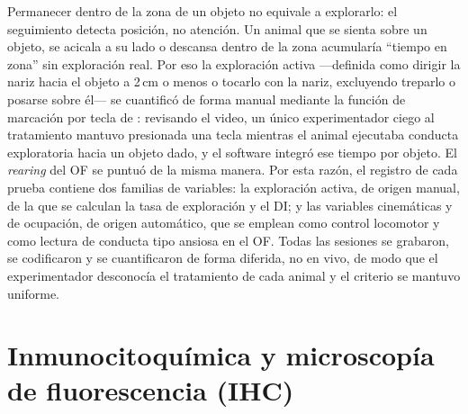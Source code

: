 Permanecer dentro de la zona de un objeto no equivale a explorarlo: el seguimiento detecta posición, no atención. Un animal que se sienta sobre un objeto, se acicala a su lado o descansa dentro de la zona acumularía \enquote{tiempo en zona} sin exploración real. Por eso la exploración activa ---definida como dirigir la nariz hacia el objeto a 2\,cm o menos o tocarlo con la nariz, excluyendo treparlo o posarse sobre él--- se cuantificó de forma manual mediante la función de marcación por tecla de \anymaze: revisando el video, un único experimentador ciego al tratamiento mantuvo presionada una tecla mientras el animal ejecutaba conducta exploratoria hacia un objeto dado, y el software integró ese tiempo por objeto. El \textit{rearing} del OF se puntuó de la misma manera. Por esta razón, el registro de cada prueba contiene dos familias de variables: la exploración activa, de origen manual, de la que se calculan la tasa de exploración y el DI; y las variables cinemáticas y de ocupación, de origen automático, que se emplean como control locomotor y como lectura de conducta tipo ansiosa en el OF. Todas las sesiones se grabaron, se codificaron y se cuantificaron de forma diferida, no en vivo, de modo que el experimentador desconocía el tratamiento de cada animal y el criterio se mantuvo uniforme.

\FloatBarrier
\section{Inmunocitoquímica y microscopía de fluorescencia (IHC)}\label{sec:histologia}

